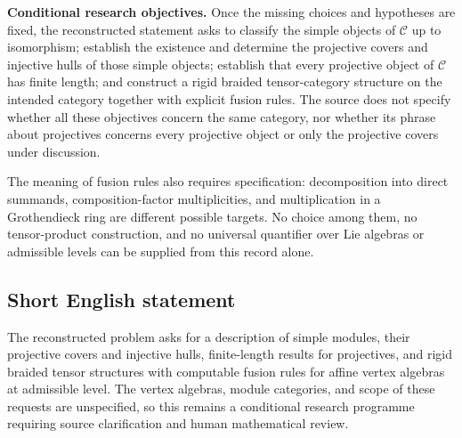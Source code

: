 \documentclass[11pt]{article}
\begin{document}
\textbf{Conditional research objectives.} Once the missing choices and hypotheses are fixed, the reconstructed statement asks to classify the simple objects of \(\mathcal C\) up to isomorphism; establish the existence and determine the projective covers and injective hulls of those simple objects; establish that every projective object of \(\mathcal C\) has finite length; and construct a rigid braided tensor-category structure on the intended category together with explicit fusion rules. The source does not specify whether all these objectives concern the same category, nor whether its phrase about projectives concerns every projective object or only the projective covers under discussion.

The meaning of fusion rules also requires specification: decomposition into direct summands, composition-factor multiplicities, and multiplication in a Grothendieck ring are different possible targets. No choice among them, no tensor-product construction, and no universal quantifier over Lie algebras or admissible levels can be supplied from this record alone.
\subsection{Short English statement}
The reconstructed problem asks for a description of simple modules, their projective covers and injective hulls, finite-length results for projectives, and rigid braided tensor structures with computable fusion rules for affine vertex algebras at admissible level. The vertex algebras, module categories, and scope of these requests are unspecified, so this remains a conditional research programme requiring source clarification and human mathematical review.
\end{document}
